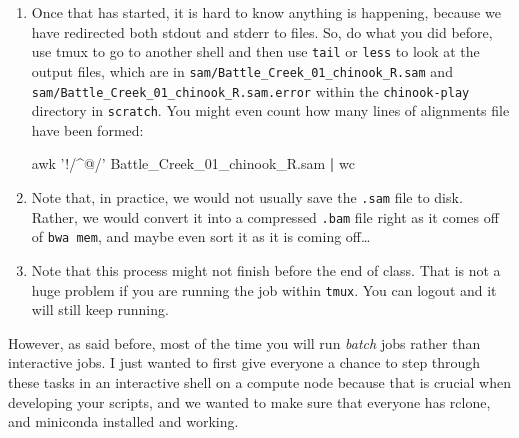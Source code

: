 \documentclass[]{krantz}
\makeatletter
\newenvironment{Shaded}{\begin{snugshade}}{\end{snugshade}}
\newcommand{\BuiltInTok}[1]{#1}
\newcommand{\CommentTok}[1]{\textcolor[rgb]{0.37,0.37,0.37}{\textit{#1}}}
\newcommand{\ExtensionTok}[1]{#1}
\newcommand{\FunctionTok}[1]{\textcolor[rgb]{0,0,0}{#1}}
\newcommand{\KeywordTok}[1]{\textcolor[rgb]{0.27,0.27,0.27}{\textbf{#1}}}
\newcommand{\NormalTok}[1]{#1}
\newcommand{\OperatorTok}[1]{\textcolor[rgb]{0.43,0.43,0.43}{\textbf{#1}}}
\newcommand{\StringTok}[1]{\textcolor[rgb]{0.5,0.5,0.5}{#1}}
\newcommand{\VariableTok}[1]{\textcolor[rgb]{0,0,0}{#1}}
\newenvironment{kframe}{%
\medskip{}
\setlength{\fboxsep}{.8em}
 \def\at@end@of@kframe{}%
 \ifinner\ifhmode%
  \def\at@end@of@kframe{\end{minipage}}%
  \begin{minipage}{\columnwidth}%
 \fi\fi%
 \def\FrameCommand##1{\hskip\@totalleftmargin \hskip-\fboxsep
 \colorbox{shadecolor}{##1}\hskip-\fboxsep
     \hskip-\linewidth \hskip-\@totalleftmargin \hskip\columnwidth}%
 \MakeFramed {\advance\hsize-\width
   \@totalleftmargin\z@ \linewidth\hsize
   \@setminipage}}%
 {\par\unskip\endMakeFramed%
 \at@end@of@kframe}
\renewenvironment{Shaded}{\begin{kframe}}{\end{kframe}}
\makeatother
\begin{document}
\begin{enumerate}
\begin{Shaded}
\end{Shaded}
\item
  Once that has started, it is hard to know anything is happening, because we have
  redirected both stdout and stderr to files. So, do what you did before, use tmux to
  go to another shell and then use \texttt{tail} or \texttt{less} to look at the output files, which
  are in \texttt{sam/Battle\_Creek\_01\_chinook\_R.sam} and \texttt{sam/Battle\_Creek\_01\_chinook\_R.sam.error}
  within the \texttt{chinook-play} directory in \texttt{scratch}. You might even count how many
  lines of alignments file have been formed:

\begin{Shaded}
\begin{Highlighting}[]
\FunctionTok{awk} \StringTok{'!/^@/'}\NormalTok{ Battle_Creek_01_chinook_R.sam }\KeywordTok{|} \FunctionTok{wc} 
\end{Highlighting}
\end{Shaded}
\item
  Note that, in practice, we would not usually save the \texttt{.sam} file to disk. Rather, we would
  convert it into a compressed \texttt{.bam} file right as it comes off of \texttt{bwa\ mem}, and maybe even sort it
  as it is coming off\ldots{}
\item
  Note that this process might not finish before the end of class. That is not a huge problem
  if you are running the job within \texttt{tmux}. You can logout and it will still keep running.
\end{enumerate}

However, as said before, most of the time you will run \emph{batch} jobs rather than interactive jobs.
I just wanted to first give everyone a chance to step through these tasks in an interactive shell
on a compute node because that is crucial when developing your scripts, and we wanted to
make sure that everyone has rclone, and miniconda installed and working.
\end{document}
